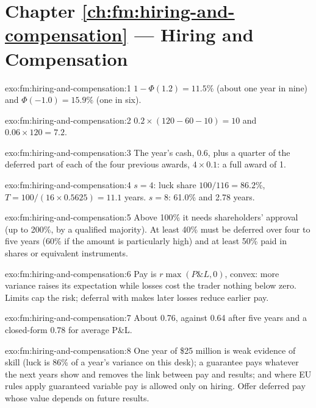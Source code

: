 \section*{Chapter \ref{ch:fm:hiring-and-compensation} --- Hiring and Compensation}

\begin{solution}{exo:fm:hiring-and-compensation:1}
$1-\Phi(1.2)=11.5\%$ (about one year in nine) and $\Phi(-1.0)=15.9\%$ (one in six).
\end{solution}

\begin{solution}{exo:fm:hiring-and-compensation:2}
$0.2\times(120-60-10)=10$ and $0.06\times120=7.2$.
\end{solution}

\begin{solution}{exo:fm:hiring-and-compensation:3}
The year's cash, 0.6, plus a quarter of the deferred part of each of the four previous awards, $4\times0.1$: a full award of 1.
\end{solution}

\begin{solution}{exo:fm:hiring-and-compensation:4}
$s=4$: luck share $100/116=86.2\%$, $T=100/(16\times0.5625)=11.1$ years. $s=8$: 61.0\% and 2.78 years.
\end{solution}

\begin{solution}{exo:fm:hiring-and-compensation:5}
Above 100\% it needs shareholders' approval (up to 200\%, by a qualified majority). At least 40\% must be deferred over four to five years (60\% if
the amount is particularly high) and at least 50\% paid in shares or equivalent instruments.
\end{solution}

\begin{solution}{exo:fm:hiring-and-compensation:6}
Pay is $r\max(P\&L,0)$, convex: more variance raises its expectation while losses cost the trader nothing below zero. Limits cap the risk; deferral
with  makes later losses reduce earlier pay.
\end{solution}

\begin{solution}{exo:fm:hiring-and-compensation:7}
About 0.76, against 0.64 after five years and a closed-form 0.78 for average P\&L.
\end{solution}

\begin{solution}{exo:fm:hiring-and-compensation:8}
One year of \$25 million is weak evidence of skill (luck is 86\% of a year's variance on this desk); a guarantee pays whatever the next years
show and removes the link between pay and results; and where EU rules apply guaranteed variable pay is allowed only on hiring. Offer deferred pay
whose value depends on future results.
\end{solution}

